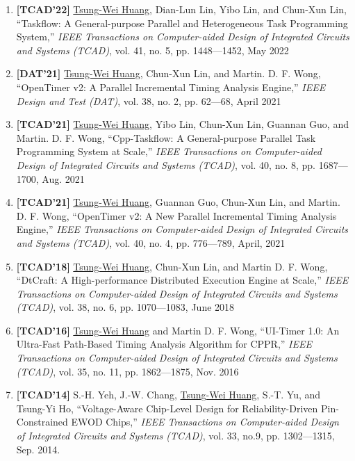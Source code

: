 \documentclass[A4,11pt]{article}
\begin{document}
\begin{enumerate}
  \item \textbf{[TCAD'22]} \underline{Tsung-Wei Huang}, Dian-Lun Lin, Yibo Lin, and Chun-Xun Lin, ``Taskflow: A General-purpose Parallel and Heterogeneous Task Programming System,'' \textit{IEEE Transactions on Computer-aided Design of Integrated Circuits and Systems (TCAD)}, vol. 41, no. 5, pp. 1448—1452, May 2022

  \item \textbf{[DAT'21]} \underline{Tsung-Wei Huang}, Chun-Xun Lin, and Martin. D. F. Wong, ``OpenTimer v2: A Parallel Incremental Timing Analysis Engine,'' \textit{IEEE Design and Test (DAT)}, vol. 38, no. 2, pp. 62—68, April 2021

  \item \textbf{[TCAD'21]} \underline{Tsung-Wei Huang}, Yibo Lin, Chun-Xun Lin, Guannan Guo, and Martin. D. F. Wong, ``Cpp-Taskflow: A General-purpose Parallel Task Programming System at Scale,'' \textit{IEEE Transactions on Computer-aided Design of Integrated Circuits and Systems (TCAD)}, vol. 40, no. 8, pp. 1687—1700, Aug. 2021

  \item \textbf{[TCAD'21]} \underline{Tsung-Wei Huang}, Guannan Guo, Chun-Xun Lin, and Martin. D. F. Wong, ``OpenTimer v2: A New Parallel Incremental Timing Analysis Engine,'' \textit{IEEE Transactions on Computer-aided Design of Integrated Circuits and Systems (TCAD)}, vol. 40, no. 4, pp. 776—789, April, 2021

  \item \textbf{[TCAD'18]} \underline{Tsung-Wei Huang}, Chun-Xun Lin, and Martin D. F. Wong, ``DtCraft: A High-performance Distributed Execution Engine at Scale,'' \textit{IEEE Transactions on Computer-aided Design of Integrated Circuits and Systems (TCAD)}, vol. 38, no. 6, pp. 1070—1083, June 2018

  \item \textbf{[TCAD'16]} \underline{Tsung-Wei Huang} and Martin D. F. Wong, ``UI-Timer 1.0: An Ultra-Fast Path-Based Timing Analysis Algorithm for CPPR,'' \textit{IEEE Transactions on Computer-aided Design of Integrated Circuits and Systems (TCAD)}, vol. 35, no. 11, pp. 1862—1875, Nov. 2016

  \item \textbf{[TCAD'14]} S.-H. Yeh, J.-W. Chang, \underline{Tsung-Wei Huang}, S.-T. Yu, and Tsung-Yi Ho, ``Voltage-Aware Chip-Level Design for Reliability-Driven Pin-Constrained EWOD Chips,'' \textit{IEEE Transactions on Computer-aided Design of Integrated Circuits and Systems (TCAD)}, vol. 33, no.9, pp. 1302—1315, Sep. 2014. 


\end{enumerate}
\end{document}
